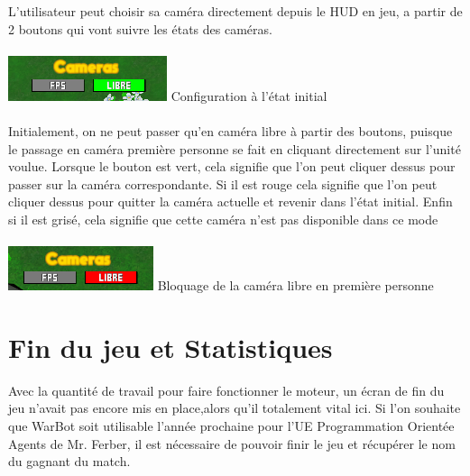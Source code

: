 \documentclass{report}
\begin{document}
L’utilisateur peut choisir sa caméra directement depuis le HUD en jeu,  a partir de 2 boutons qui vont suivre les états des caméras.

\paragraph{}
\begin{center}
\includegraphics[scale=1]{DATA/cem.png}
 {Configuration à l’état initial}
\end{center}
\paragraph{}

Initialement, on ne peut passer qu’en caméra libre à partir des boutons, puisque le passage en caméra première personne se fait en cliquant directement sur l’unité voulue.
Lorsque le bouton est vert, cela signifie que l’on peut cliquer dessus pour passer sur la caméra correspondante. Si il est rouge cela signifie que l’on peut cliquer dessus pour quitter la caméra actuelle et revenir dans l’état initial. 
Enfin si il est grisé, cela signifie que cette caméra n’est pas disponible dans ce mode

\paragraph{}
\begin{center}
\includegraphics[scale=1]{DATA/Sanstitre3.png}
 {Bloquage de la caméra libre en première personne}
\end{center}
\paragraph{}
\newpage


\section{Fin du jeu et Statistiques}

Avec la quantité de travail pour faire fonctionner le moteur, un écran de fin du jeu n’avait pas encore mis en place,alors qu’il totalement vital ici. Si l’on souhaite que WarBot soit utilisable l’année prochaine pour l’UE Programmation Orientée Agents de Mr. Ferber, il est nécessaire de pouvoir finir le jeu et récupérer le nom du gagnant du match.
\end{document}
